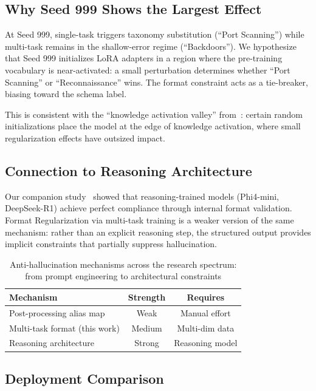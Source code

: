 \documentclass[review,3p]{elsarticle}
\begin{document}
\subsection{Why Seed 999 Shows the Largest Effect}
At Seed 999, single-task triggers taxonomy substitution (``Port Scanning'') while multi-task remains in the shallow-error regime (``Backdoors''). We hypothesize that Seed 999 initializes LoRA adapters in a region where the pre-training vocabulary is near-activated: a small perturbation determines whether ``Port Scanning'' or ``Reconnaissance'' wins. The format constraint acts as a tie-breaker, biasing toward the schema label.

This is consistent with the ``knowledge activation valley'' from~\cite{p6}: certain random initializations place the model at the edge of knowledge activation, where small regularization effects have outsized impact.

\subsection{Connection to Reasoning Architecture}
Our companion study~\cite{p21} showed that reasoning-trained models (Phi4-mini, DeepSeek-R1) achieve perfect compliance through internal format validation. Format Regularization via multi-task training is a weaker version of the same mechanism: rather than an explicit reasoning step, the structured output provides implicit constraints that partially suppress hallucination.

\begin{table}[!ht]
\centering
\caption{Anti-hallucination mechanisms across the research spectrum: from prompt engineering to architectural constraints}
\label{tab:spectrum}
\begin{tabular}{lcc}
\toprule
\textbf{Mechanism} & \textbf{Strength} & \textbf{Requires} \\
\midrule
Post-processing alias map & Weak & Manual effort \\
Multi-task format (this work) & Medium & Multi-dim data \\
Reasoning architecture~\cite{p21} & Strong & Reasoning model \\
\bottomrule
\end{tabular}
\end{table}

\subsection{Deployment Comparison}
\end{document}

